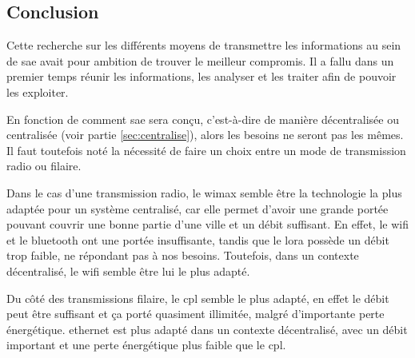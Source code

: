 \subsection{Conclusion}
\label{sec:comparaisonProtocoleCommnunicationConclusion}

Cette recherche sur les différents moyens de transmettre les informations au sein de \gls{sae} avait pour ambition de trouver le meilleur compromis.
Il a fallu dans un premier temps réunir les informations, les analyser et les traiter afin de pouvoir les exploiter.\newline

En fonction de comment \gls{sae} sera conçu, c'est-à-dire de manière décentralisée ou centralisée (voir partie \ref{sec:centralise}), alors les
besoins ne seront pas les mêmes.
Il faut toutefois noté la nécessité de faire un choix entre un mode de transmission radio ou filaire.\newline

Dans le cas d'une transmission radio, le \gls{wimax} semble être la technologie la plus adaptée pour un système centralisé, car elle permet d'avoir
une grande portée pouvant couvrir une bonne partie d'une ville et un débit suffisant.
En effet, le \gls{wifi} et le \gls{bluetooth} ont une portée insuffisante, tandis que le \gls{lora} possède un débit trop faible,
ne répondant pas à nos besoins. Toutefois, dans un contexte décentralisé, le \gls{wifi} semble être lui le plus adapté.\newline

Du côté des transmissions filaire, le \gls{cpl} semble le plus adapté, en effet le débit peut être suffisant et ça porté quasiment illimitée, malgré
d'importante perte énergétique. \Gls{ethernet} est plus adapté dans un contexte décentralisé, avec un débit important et une perte énergétique
plus faible que le \gls{cpl}.
